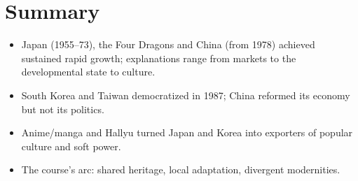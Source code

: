 \section*{Summary}
\begin{itemize}
  \item Japan (1955--73), the Four Dragons and China (from 1978) achieved sustained rapid
        growth; explanations range from markets to the developmental state to culture.
  \item South Korea and Taiwan democratized in 1987; China reformed its economy but not its
        politics.
  \item Anime/manga and Hallyu turned Japan and Korea into exporters of popular culture
        and soft power.
  \item The course's arc: shared heritage, local adaptation, divergent modernities.
\end{itemize}
